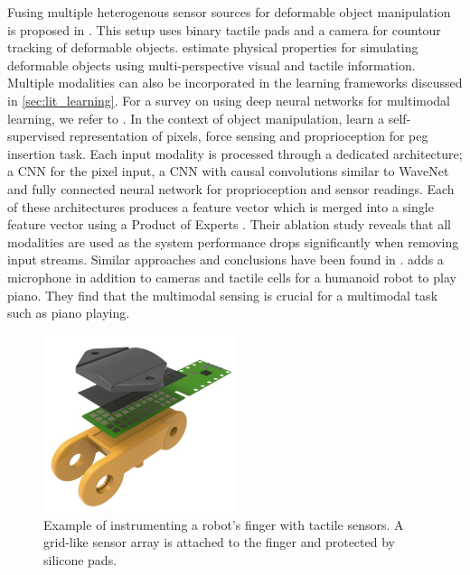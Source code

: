 \documentclass[\home/main.tex]{subfiles}
\begin{document}
Fusing multiple heterogenous sensor sources for deformable object manipulation is proposed in \autocite{khalil2010integrated}. This setup uses binary tactile pads and a camera for countour tracking of deformable objects. \Textcite{Frank2010} estimate physical properties for simulating deformable objects using multi-perspective visual and tactile information. Multiple modalities can also be incorporated in the learning frameworks discussed in \cref{sec:lit_learning}. For a survey on using deep neural networks for multimodal learning, we refer to \autocite{ramachandram2017deep}. In the context of object manipulation, \autocite{lee2020making} learn a self-supervised representation of pixels, force sensing and proprioception for peg insertion task. Each input modality is processed through a dedicated architecture; a \gls{CNN} for the pixel input, a \gls{CNN} with causal convolutions similar to WaveNet \autocite{WaveNet} and fully connected neural network for proprioception and sensor readings. Each of these architectures produces a feature vector which is merged into a single feature vector using a Product of Experts \autocite{hinton2002training}. Their ablation study reveals that all modalities are used as the system performance drops significantly when removing input streams. Similar approaches and conclusions have been found in \autocite{Calandra2018, Droniou2015, balakuntala2021learning}. \Textcite{zambelli2016online} adds a microphone in addition to cameras and tactile cells for a humanoid robot to play piano. They find that the multimodal sensing is crucial for a multimodal task such as piano playing.  

\begin{figure}[htbp]
	\centering
	\includegraphics[width=0.5\textwidth]{figures/velostat-sensor.jpg}	
	\caption[Example of instrumenting the robot.]{Example of instrumenting a robot's finger with tactile sensors. A grid-like sensor array is attached to the finger and protected by silicone pads.}
	\label{fig:instrumentation_example}
\end{figure}
\end{document}
